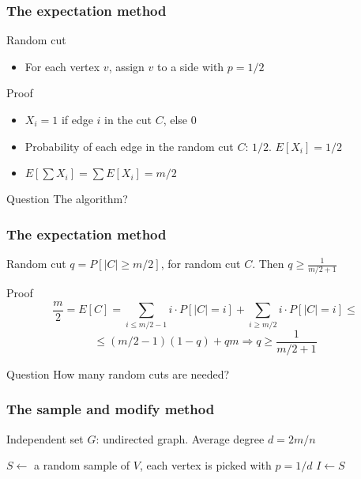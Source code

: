 \documentclass[12pt,aspectratio=169]{beamer}
\begin{document}
\begin{frame}[fragile]
\frametitle{The expectation method}
\begin{block}{Random cut}
  \begin{itemize}
    \item
      For each vertex $v$, assign $v$ to a side with $p=1/2$
    \end{itemize}
  \end{block}

  \begin{block}{Proof}
    \begin{itemize}
    \item
      $X_{i} = 1$ if edge $i$ in the cut $C$, else $0$
    \item
      Probability of each edge in the random cut $C$: $1/2$.
%
      $E[X_{i}] = 1/2$
    \item
      $E[\sum X_{i}] = \sum E[X_{i}] = m/2$
    \end{itemize}
  \end{block}

  \begin{block}{Question}
    The algorithm?
  \end{block}
\end{frame}

\begin{frame}[fragile]
\frametitle{The expectation method}
\begin{block}{Random cut}
      $q=P[|C| \ge m/2]$, for random cut $C$.
%
      Then $q\ge \frac{1}{m/2 + 1}$
  \end{block}

  \begin{block}{Proof}
    \[
      \frac{m}{2} = E[C] = \sum_{i\le m/2 - 1} i \cdot P[|C| = i] +
      \sum_{i\ge m/2} i \cdot P[|C| = i] \le 
    \]
    \[
      \le (m/2 - 1)(1-q) + qm \Rightarrow q \ge \frac{1}{m/2 + 1}
      \]
  \end{block}

  \begin{block}{Question}
    How many random cuts are needed?
  \end{block}
\end{frame}

\begin{frame}[fragile]
\frametitle{The sample and modify method}
  \begin{block}{Independent set}
    $G$: undirected graph.
%
    Average degree $d=2m/n$
  \end{block}


\begin{algorithm}[H]
$S\gets$ a random sample of $V$, each vertex is picked with $p=1/d$\;
$I\gets S$\;
\caption{Random Independent Set}
\end{algorithm}
\end{frame}
\end{document}

